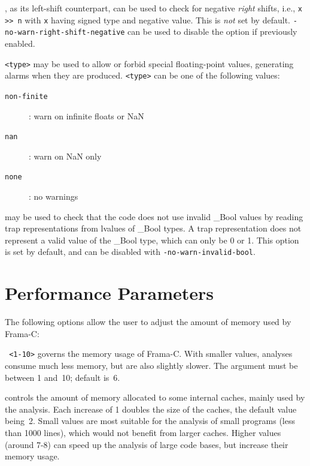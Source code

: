 \begin{description}
\item {}, as its left-shift counterpart,
  can be used to check for negative {\em right} shifts, i.e.,
  \lstinline|x >> n| with \lstinline|x| having signed type and negative value.
  This is {\em not} set by default.
  \texttt{-no-warn-right-shift-negative} can be used to disable the option if
  previously enabled.

\item {} \texttt{<type>} may be used to allow
  or forbid special floating-point values, generating alarms when they are
  produced. \texttt{<type>} can be one of the following values:
  \begin{description}
  \item[\texttt{non-finite}]: warn on infinite floats or NaN
  \item[\texttt{nan}]: warn on NaN only
  \item[\texttt{none}]: no warnings
  \end{description}

\item {} may be used to check that the code
  does not use invalid \_Bool values by reading trap representations
  from lvalues of \_Bool types. A trap representation does not represent
  a valid value of the \_Bool type, which can only be 0 or 1.
  This option is set by default, and can be disabled with
  \texttt{-no-warn-invalid-bool}.
\end{description}


\section{Performance Parameters}

The following options allow the user to adjust the amount of memory
used by Frama-C:

\begin{description}

\item \texttt{ <1-10>}
governs the memory usage of Frama-C.
With smaller values, analyses consume much less memory,
but are also slightly slower.
The argument must be between 1 and 10; default is 6.

\item {}
controls the amount of memory allocated to some internal caches,
mainly used by the \Eva analysis.
Each increase of 1 doubles the size of the caches, the default value being 2.
Small values are most suitable for the analysis of small programs
(less than 1000 lines), which would not benefit from larger caches.
Higher values (around 7-8) can speed up the analysis of large code bases,
but increase their memory usage.

\end{description}
